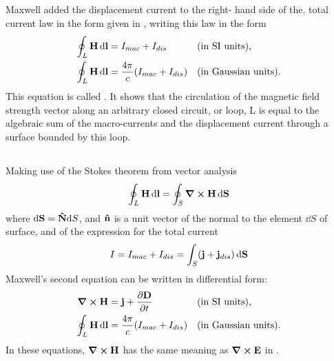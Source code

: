 \subsection{}\label{27.3.4} Maxwell added the displacement current to the right- hand side of the. total current law in the form given in , writing this law in the form
\begin{align*}%
\oint_{L} \vb{H} \, \dd \vb{l} & = I_{mac} + I_{dis}  && \text{(in SI units),} \\
\oint_{L} \vb{H} \, \dd \vb{l} & = \frac{4 \pi}{c}(I_{mac} + I_{dis}) && \text{(in Gaussian units).}
\end{align*}
This equation is called . It shows that the circulation of the magnetic field strength vector along an arbitrary closed circuit, or loop, L is equal to the algebraic sum of the macro-currents and the displacement current through a surface bounded by this loop.

\subsection{}\label{27.3.5} Making use of the Stokes theorem from vector analysis
\begin{equation*}%
\oint_{L} \vb{H} \, \dd \vb{l}  = \oint_{S} \curl \vb{H} \, \dd \vb{S}
\end{equation*}
where $\dd \vb{S} = \vu{N} \dd S$, and $\vu{n}$ is a unit vector of the normal to the element $\dd S$ of surface, and of the expression for the total current
\begin{equation*}%
I = I_{mac} + I_{dis} = \int_{S} (\vb{j} + \vb{j}_{dis}) \, \dd \vb{S}
\end{equation*}
Maxwell's second equation can be written in differential form: \begin{align*}%
\curl \vb{H} & = \vb{j} + \pdv{\vb{D}}{t} && \text{(in SI units),} \\
\oint_{L} \vb{H} \, \dd \vb{l} & = \frac{4 \pi}{c}(I_{mac} + I_{dis}) && \text{(in Gaussian units).}
\end{align*}
In these equations, $\curl \vb{H}$ has the same meaning as $\curl \vb{E}$ in .

